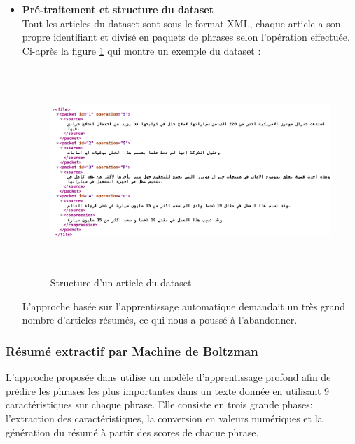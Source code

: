\begin{itemize}[leftmargin=*]
                \item{\textbf{Pré-traitement et structure du dataset}}\\
                Tout les articles du dataset sont sous le format XML, chaque article a son propre identifiant et divisé en paquets de phrases selon l'opération effectuée. Ci-après la figure \ref{xml-structure} qui montre un exemple du dataset : 
                \begin{figure}[H]
                    \centering
                    \includegraphics[height=220pt,width=430pt]{img/chapter4/xml.png}
                    \caption{Structure d'un article du dataset}
                    \label{xml-structure}
                \end{figure}
                L'approche basée sur l'apprentissage automatique demandait un très grand nombre d'articles résumés, ce qui nous a poussé à l'abandonner.
            \end{itemize}
        \subsubsection{Résumé extractif par Machine de Boltzman}
            L'approche proposée dans \cite{boltzman} utilise un modèle d'apprentissage profond afin de prédire les phrases les plus importantes dans un texte donnée en utilisant 9 caractéristiques sur chaque phrase. Elle consiste en trois grande phases: l'extraction des caractéristiques, la conversion en valeurs numériques et la génération du résumé à partir des scores de chaque phrase. 

